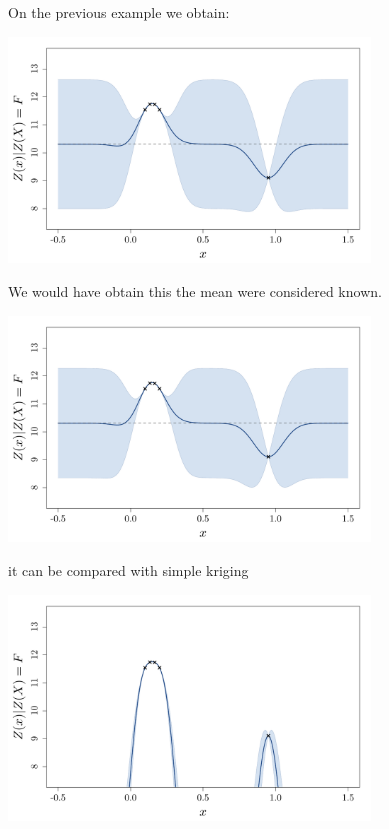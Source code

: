 \documentclass{beamer}
\begin{document}
\begin{frame}{}
On the previous example we obtain:
\begin{center}
	\includegraphics[height=6cm]{figures/R/trend_ko}
\end{center}
\end{frame}

\begin{frame}{}
We would have obtain this the mean were considered known.
\begin{center}
	\includegraphics[height=6cm]{figures/R/trend_badko}
\end{center}
\end{frame}

\begin{frame}{}
it can be compared with simple kriging
\begin{center}
	\includegraphics[height=6cm]{figures/R/trend_badks}
\end{center}
\end{frame}
\end{document}
